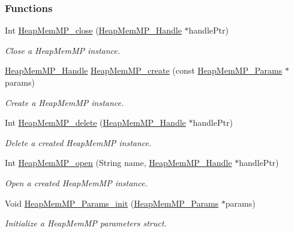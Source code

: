 \subsubsection*{Functions}
\begin{DoxyCompactItemize}
\item 
Int \hyperlink{_heap_mem_m_p_8h_ac3fcc6ef980577f060f738f3485013f1}{Heap\-Mem\-M\-P\-\_\-close} (\hyperlink{_heap_mem_m_p_8h_a9aa6360e22c2f5f387c5aba52a1a8522}{Heap\-Mem\-M\-P\-\_\-\-Handle} $\ast$handle\-Ptr)
\begin{DoxyCompactList}\small\item\em Close a Heap\-Mem\-M\-P instance. \end{DoxyCompactList}\item 
\hyperlink{_heap_mem_m_p_8h_a9aa6360e22c2f5f387c5aba52a1a8522}{Heap\-Mem\-M\-P\-\_\-\-Handle} \hyperlink{_heap_mem_m_p_8h_a3ee79b7e84e8eaef048c919be45e0a7c}{Heap\-Mem\-M\-P\-\_\-create} (const \hyperlink{struct_heap_mem_m_p___params}{Heap\-Mem\-M\-P\-\_\-\-Params} $\ast$params)
\begin{DoxyCompactList}\small\item\em Create a Heap\-Mem\-M\-P instance. \end{DoxyCompactList}\item 
Int \hyperlink{_heap_mem_m_p_8h_a0041a019dcc514bf6de66997a3383a02}{Heap\-Mem\-M\-P\-\_\-delete} (\hyperlink{_heap_mem_m_p_8h_a9aa6360e22c2f5f387c5aba52a1a8522}{Heap\-Mem\-M\-P\-\_\-\-Handle} $\ast$handle\-Ptr)
\begin{DoxyCompactList}\small\item\em Delete a created Heap\-Mem\-M\-P instance. \end{DoxyCompactList}\item 
Int \hyperlink{_heap_mem_m_p_8h_a05598b30cd1a93e88e59cea962d1e976}{Heap\-Mem\-M\-P\-\_\-open} (String name, \hyperlink{_heap_mem_m_p_8h_a9aa6360e22c2f5f387c5aba52a1a8522}{Heap\-Mem\-M\-P\-\_\-\-Handle} $\ast$handle\-Ptr)
\begin{DoxyCompactList}\small\item\em Open a created Heap\-Mem\-M\-P instance. \end{DoxyCompactList}\item 
Void \hyperlink{_heap_mem_m_p_8h_ade4b085199639e1184e221725e03a962}{Heap\-Mem\-M\-P\-\_\-\-Params\-\_\-init} (\hyperlink{struct_heap_mem_m_p___params}{Heap\-Mem\-M\-P\-\_\-\-Params} $\ast$params)
\begin{DoxyCompactList}\small\item\em Initialize a Heap\-Mem\-M\-P parameters struct. \end{DoxyCompactList}\item 

\end{DoxyCompactItemize}
